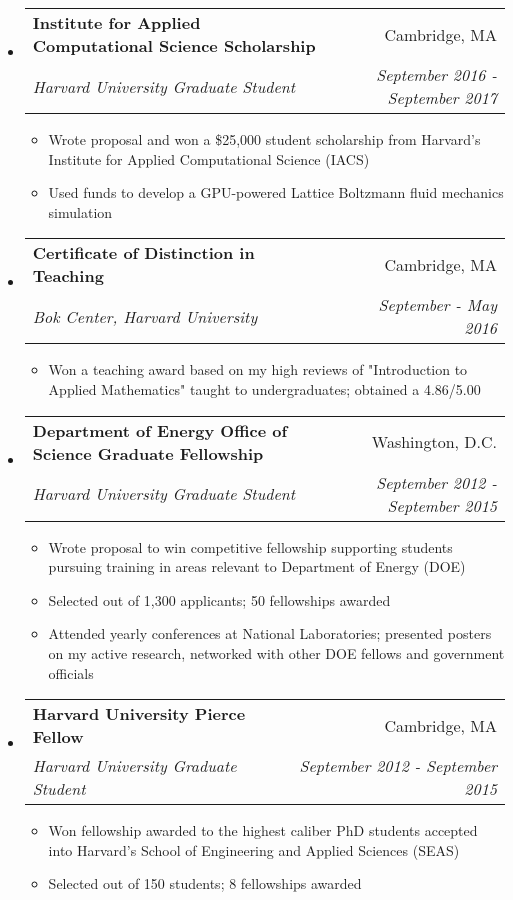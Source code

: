 \documentclass[letterpaper,11pt]{article}
\makeatletter
\newcommand{\resitem}[1]{\item #1 \vspace{-2pt}}
\newcommand{\ressubheading}[4]{\vspace{-14pt}
\begin{tabular*}{7.0in}{l@{\extracolsep{\fill}}r}
                \\
                \textbf{#1} & #2 \\
                \textit{#3} & \textit{#4} \\
\end{tabular*}\vspace{-6pt}}
\makeatother
\begin{document}
\begin{itemize}

\item \ressubheading{Institute for Applied Computational Science Scholarship}{Cambridge, MA}{Harvard University Graduate Student}{September 2016 - September 2017}

\begin{itemize}
\resitem{Wrote proposal and won a \$25,000 student scholarship from Harvard's Institute for Applied Computational Science (IACS)}

\resitem{Used funds to develop a GPU-powered Lattice Boltzmann fluid mechanics simulation}
                
                
        \end{itemize}

\item \ressubheading{Certificate of Distinction in Teaching}{Cambridge, MA}{Bok Center, Harvard University}{September - May 2016}
\begin{itemize}
\item Won a teaching award based on my high reviews of "Introduction to Applied Mathematics" taught to undergraduates; obtained a 4.86/5.00
\end{itemize}

\item \ressubheading{Department of Energy Office of Science Graduate Fellowship}{Washington, D.C.}{Harvard University Graduate Student}{September 2012 - September 2015}

\begin{itemize}
\resitem{Wrote proposal to win competitive fellowship supporting students pursuing training in areas relevant to Department of Energy (DOE)}
\resitem{Selected out of 1,300 applicants; 50 fellowships awarded}
\resitem{Attended yearly conferences at National Laboratories; presented posters on my active research, networked with other DOE fellows and government officials}
\end{itemize}

\item
        \ressubheading{Harvard University Pierce Fellow}{Cambridge, MA}{Harvard University Graduate Student}{September 2012 - September 2015}
        \begin{itemize}
                
                \resitem{Won fellowship awarded to the highest caliber PhD students accepted into Harvard's School of Engineering and Applied Sciences (SEAS)}
                
                \resitem{Selected out of 150 students; 8 fellowships awarded}
                
        \end{itemize}


\end{itemize}
\end{document}
